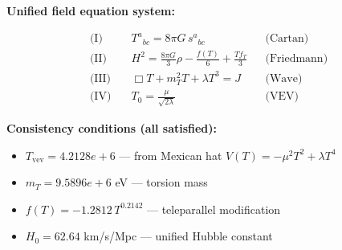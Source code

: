 
\textbf{Unified field equation system:}

\begin{align}
  \text{(I)} \quad & T^a{}_{bc} = 8\pi G \, s^a{}_{bc} && \text{(Cartan)} \\
  \text{(II)} \quad & H^2 = \frac{8\pi G}{3}\rho - \frac{f(T)}{6} + \frac{Tf_T}{3} && \text{(Friedmann)} \\
  \text{(III)} \quad & \Box T + m_T^2 T + \lambda T^3 = J && \text{(Wave)} \\
  \text{(IV)} \quad & T_0 = \frac{\mu}{\sqrt{2\lambda}} && \text{(VEV)}
\end{align}

\textbf{Consistency conditions (all satisfied):}
\begin{itemize}
  \item $T_{\text{vev}} = 4.2128e+6$ — from Mexican hat $V(T) = -\mu^2 T^2 + \lambda T^4$
  \item $m_T = 9.5896e+6$ eV — torsion mass
  \item $f(T) = -1.2812 \, T^{0.2142}$ — teleparallel modification
  \item $H_0 = 62.64$ km/s/Mpc — unified Hubble constant
\end{itemize}
